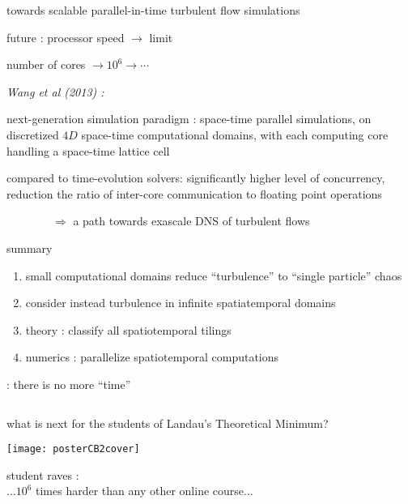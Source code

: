 \begin{frame}{towards scalable parallel-in-time turbulent flow simulations
}
\begin{block}{future :}%
processor speed $\to$ limit

\medskip

number of cores $\to 10^6 \to \cdots$

\medskip
\end{block}

\emph{Wang et al (2013)
    :} %

next-generation simulation paradigm : space-time parallel
simulations, on discretized $4D$ space-time
computational domains, with each computing core handling a space-time lattice cell

\bigskip

compared to time-evolution solvers:
significantly higher level of concurrency, reduction the ratio of
inter-core communication to floating point operations

\bigskip

$\qquad\qquad\Rightarrow$ a path towards exascale DNS of turbulent flows
\end{frame}


\begin{frame}{summary}
\begin{enumerate}
              \item
small computational domains reduce ``turbulence'' to ``single particle'' chaos
              \item
consider instead turbulence in infinite spatiatemporal domains
              \item
theory : classify all spatiotemporal tilings
              \item
numerics : parallelize spatiotemporal computations
\end{enumerate}

\vfill

\color{red}{``dynamics'' is dead} : there is no more ``time''

\medskip

$\qquad$ \color{blue}{there is only enumeration of spacetime solutions}
\end{frame}

\begin{frame}{
what is next for the students of Landau's Theoretical Minimum?
\\
}
\begin{center}
\texttt{[image: posterCB2cover]}
\end{center}
\vfill
student raves : \\
...$10^6$ times harder than any other online course...
\end{frame}


